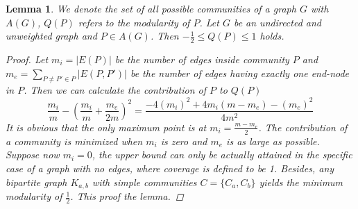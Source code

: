 \documentclass[11pt]{article}
\newtheorem{lemma}[theorem]{Lemma}
\begin{document}
\begin{lemma}
  We denote the set of all possible communities of a graph $G$ with $A(G)$, $Q(P)$ refers to the modularity of $P$. 
  Let $G$ be an undirected and unweighted graph and $P \in A(G)$. Then $-\frac{1}{2}\le Q(P) \le 1$ holds.
  \begin{proof}
    Let $m_i=|E(P)|$ be the number of edges inside community $P$ and $m_e=\sum_{P\neq P'\in P}|E(P, P')|$ be the number of edges having exactly one end-node in $P$. Then we can calculate the contribution of $P$ to $Q(P)$
    \begin{equation}
      \frac{m_i}{m}-(\frac{m_i}{m}+\frac{m_e}{2m})^2=\frac{-4(m_i)^2+4m_i(m-m_e)-(m_e)^2}{4m^2}
    \end{equation}
    It is obvious that the only maximum point is at $m_i=\frac{m-m_e}{2}$. The contribution of a community is minimized when $m_i$ is zero and $m_e$ is as large as possible.
    Suppose now $m_i=0$, the upper bound can only be actually attained in the specific case of a graph with no edges, where coverage is defined to be 1.
    Besides, any bipartite graph $K_{a,b}$ with simple communities $C=\{C_a, C_b\}$ yields the minimum modularity of $\frac{1}{2}$. This proof the lemma.
  \end{proof}
\end{lemma}
\end{document}
